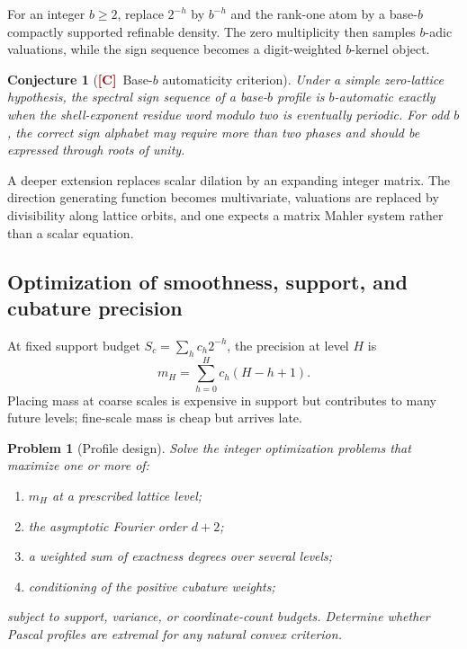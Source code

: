 \documentclass[11pt]{article}
\numberwithin{equation}{section}
\newtheorem{conjecture}[theorem]{Conjecture}
\newtheorem{problem}[theorem]{Problem}
\theoremstyle{definition}
\theoremstyle{remark}
\newcommand{\Conj}{\textcolor{darkred}{\textsf{\textbf{[C]}}}}
\begin{document}
For an integer $b\ge2$, replace $2^{-h}$ by $b^{-h}$ and the rank-one atom by a
base-$b$ compactly supported refinable density.  The zero multiplicity then
samples $b$-adic valuations, while the sign sequence becomes a digit-weighted
$b$-kernel object.

\begin{conjecture}[\Conj\ Base-$b$ automaticity criterion]
Under a simple zero-lattice hypothesis, the spectral sign sequence of a
base-$b$ profile is $b$-automatic exactly when the shell-exponent residue word
modulo two is eventually periodic.  For odd $b$, the correct sign alphabet may
require more than two phases and should be expressed through roots of unity.
\end{conjecture}

A deeper extension replaces scalar dilation by an expanding integer matrix.
The direction generating function becomes multivariate, valuations are
replaced by divisibility along lattice orbits, and one expects a matrix Mahler
system rather than a scalar equation.

\subsection{Optimization of smoothness, support, and cubature precision}

At fixed support budget
$S_c=\sum_hc_h2^{-h}$, the precision at level $H$ is
\begin{equation}
 m_H=\sum_{h=0}^{H}c_h(H-h+1).
\end{equation}
Placing mass at coarse scales is expensive in support but contributes to many
future levels; fine-scale mass is cheap but arrives late.

\begin{problem}[Profile design]
Solve the integer optimization problems that maximize one or more of:
\begin{enumerate}[label=\textup{(\roman*)},leftmargin=*]
\item $m_H$ at a prescribed lattice level;
\item the asymptotic Fourier order $d+2$;
\item a weighted sum of exactness degrees over several levels;
\item conditioning of the positive cubature weights;
\end{enumerate}
subject to support, variance, or coordinate-count budgets.  Determine whether
Pascal profiles are extremal for any natural convex criterion.
\end{problem}
\end{document}
